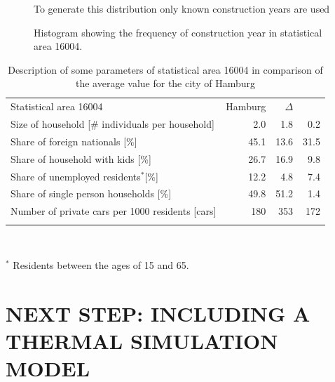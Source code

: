 \documentclass[11pt]{IJM-article}
\begin{document}
\begin{figure}[htb] 
    \centering 
    \caption{Histogram showing the frequency of construction year in
    statistical area 16004.}
    \label{fig:8} 
    
    \begin{flushleft}
    \begin{footnotesize}
        To generate this distribution only known construction years are used
    \end{footnotesize}
    \end{flushleft}
\end{figure}

\begin{table}[htb]
    \centering 
    \caption{Description of some parameters of statistical area 16004 in
    comparison of the average value for the city of Hamburg}
    \label{tab:6}
    \begin{tabular}{lrrr}
        \addlinespace
        \toprule
        Statistical area 16004 & Hamburg & $\Delta$\\
        Size of household [\# individuals per household]&   2.0 &   1.8 &  0.2\\ 
        Share of foreign nationals [\%]                 &  45.1 &  13.6 & 31.5\\ 
        Share of household with kids [\%]               &  26.7 &  16.9 &  9.8\\ 
        Share of unemployed residents$^*$[\%]           &  12.2 &   4.8 &  7.4\\ 
        Share of single person households [\%]          &  49.8 &  51.2 &  1.4\\ 
        Number of private cars per 1000 residents [cars]& 180   & 353   &172  \\ 
        \bottomrule \addlinespace 
    \end{tabular} \\ 
    \begin{footnotesize}
        $^*$ Residents between the ages of 15 and 65.
    \end{footnotesize}
\end{table}

\section{NEXT STEP: INCLUDING A THERMAL SIMULATION MODEL}
\label{sec:9}
\end{document}
